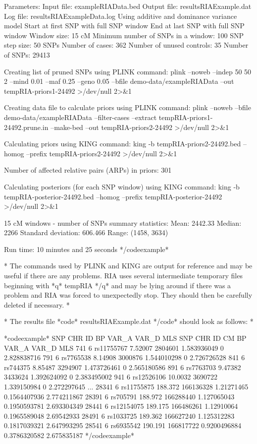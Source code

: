 Parameters:
Input file: exampleRIAData.bed
Output file: resultsRIAExample.dat
Log file: resultsRIAExampleData.log
Using additive and dominance variance model
Start at first SNP with full SNP window
End at last SNP with full SNP window
Window size: 15 cM
Minimum number of SNPs in a window: 100
SNP step size: 50 SNPs
Number of cases: 362
Number of unused controls: 35
Number of SNPs: 29413

Creating list of pruned SNPs using PLINK command:
plink --noweb --indep 50 50 2 --mind 0.01 --maf 0.25 --geno 0.05 --bfile demo-data/exampleRIAData --out tempRIA-priors1-24492 >/dev/null 2>&1

Creating data file to calculate priors using PLINK command:
plink --noweb --bfile demo-data/exampleRIAData --filter-cases --extract tempRIA-priors1-24492.prune.in --make-bed --out tempRIA-priors2-24492 >/dev/null 2>&1

Calculating priors using KING command:
king -b tempRIA-priors2-24492.bed --homog --prefix tempRIA-priors2-24492 >/dev/null 2>&1

Number of affected relative pairs (ARPs) in priors: 301

Calculating posteriors (for each SNP window) using KING command:
king -b tempRIA-posterior-24492.bed --homog --prefix tempRIA-posterior-24492 >/dev/null 2>&1

15 cM windows - number of SNPs summary statistics:
Mean: 2442.33
Median: 2266
Standard deviation: 606.466
Range: (1458, 3634)

Run time: 10 minutes and 25 seconds
*/codeexample*

*
The commands used by PLINK and KING are output for reference and may be useful if there are any problems. RIA uses several intermediate temporary files beginning with *q* tempRIA */q* and may be lying around if there was a problem and RIA was forced to unexpectedly stop. They should then be carefully deleted if necessary.
*

*
The results file *code* resultsRIAExample.dat */code* should look as follows:
*

*codeexample*
SNP CHR ID BP VAR_A VAR_D MLS
SNP CHR ID CM BP VAR_A VAR_D MLS
741 6 rs11755767 7.52007 2804601 1.583936049 0 2.828838716
791 6 rs7765538 8.14908 3000876 1.544010298 0 2.726726528
841 6 rs744375 8.85487 3294907 1.473726461 0 2.565180586
891 6 rs7763703 9.47382 3433624 1.392624092 0 2.383495002
941 6 rs12526106 10.0032 3690722 1.339150984 0 2.272297645
...
28341 6 rs11755875 188.372 166136328 1.21271465 0.1564407936 2.774211867
28391 6 rs705791 188.972 166288440 1.127065043 0.1950593781 2.693304349
28441 6 rs12154075 189.175 166486261 1.12910064 0.1965589048 2.69542933
28491 6 rs1033725 189.362 166627240 1.125312283 0.1817039321 2.647993295
28541 6 rs6935542 190.191 166817722 0.9200496884 0.3786320582 2.675835187
*/codeexample*

